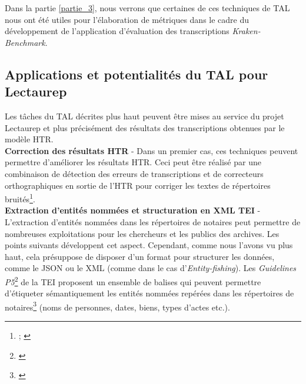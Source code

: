 Dans la partie \ref{partie_3}, nous verrons que certaines de ces techniques de TAL nous ont été utiles pour l'élaboration de métriques dans le cadre du développement de l'application d'évaluation des transcriptions \textit{Kraken-Benchmark}.

\subsection{Applications et potentialités du TAL pour Lectaurep}\label{potentialités_TAL}  

Les tâches du TAL décrites plus haut peuvent être mises au service du projet Lectaurep et plus précisément des résultats des transcriptions obtenues par le modèle HTR.\\

\textbf{Correction des résultats HTR} - Dans un premier cas, ces techniques peuvent permettre d'améliorer les résultats HTR. Ceci peut être réalisé par une combinaison de détection des erreurs de transcriptions et de correcteurs orthographiques en sortie de l'HTR pour corriger les textes de répertoires bruités\footnote{\cite{baranes_vers_2012};  \cite{magallon_detection_2018}}.\\

\textbf{Extraction d'entités nommées et structuration en XML TEI} - L'extraction d'entités nommées dans les répertoires de notaires peut permettre de nombreuses exploitations pour les chercheurs et les publics des archives. Les points suivants développent cet aspect. Cependant, comme nous l'avons vu plus haut, cela présuppose de disposer d'un format pour structurer les données, comme le JSON ou le XML (comme dans le cas d'\textit{Entity-fishing}). Les \textit{Guidelines P5}\footnote{\cite{tei_consortium_p5_2020}} de la TEI proposent un ensemble de balises qui peuvent permettre d'étiqueter sémantiquement les entités nommées repérées dans les répertoires de notaires\footnote{\cite{ruiz_concept-based_2017}} (noms de personnes, dates, biens, types d'actes etc.).\\

